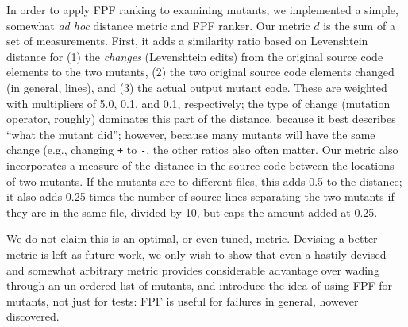In order to apply FPF ranking to examining mutants, we implemented a
simple, somewhat \emph{ad hoc} distance metric and FPF ranker.  Our metric $d$ is
the sum of a set of measurements.  First, it adds a similarity
ratio based on Levenshtein distance \cite{lev} for (1) the \emph{changes} (Levenshtein edits) from
the original source code elements to
the two mutants,  (2) the two original source code elements changed (in
general, lines), and (3) the actual output mutant code.  These are
weighted with multipliers of 5.0, 0.1, and 0.1, respectively; the type
of change (mutation operator, roughly) dominates this part of the
distance, because it best describes ``what the mutant did''; however,
because many mutants will have the same change (e.g., changing {\tt +}
to {\tt -}, the other ratios also often matter.
Our metric also incorporates a measure of the distance in the source
code between the locations of two mutants.  If the mutants are to
different files, this adds 0.5 to the distance; it also adds 0.25
times the number of source lines separating the two mutants if they
are in the same file, divided by 10, but caps the amount added at
0.25.  

We do not claim this is an optimal, or even tuned, metric. Devising a better metric is left as future work, we only wish to show 
that even a hastily-devised and somewhat arbitrary metric provides 
considerable advantage over wading through an un-ordered list of 
mutants, and introduce the idea of using FPF for mutants, not just for tests: FPF is useful for failures in general, however discovered.

